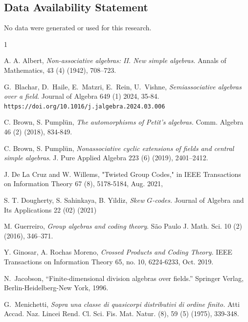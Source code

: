 \documentclass[11pt]{amsart}
\theoremstyle{plain}
\theoremstyle{definition}
\begin{document}
\subsection*{Data Availability Statement} No data were generated or used for this research.







\begin{thebibliography}{1}

 A. A. Albert, \emph{Non-associative algebras: II. New simple algebras.}
Annals of Mathematics, 43 (4) (1942), 708–723.


 G.~Blachar, D.~Haile, E.~Matzri, E.~Rein, U.~Vishne, \emph{Semiassociative algebras over a field}.
Journal of Algebra 649 (1) 2024, 35-84.
\verb#https://doi.org/10.1016/j.jalgebra.2024.03.006#

  C. Brown, S. Pumpl\"un,  \emph{The automorphisms of Petit's algebras.}
 Comm. Algebra    46 (2) (2018), 834-849. %

  C. Brown, S. Pumpl\"un, \emph{Nonassociative cyclic extensions of fields and central simple algebras}.
 J. Pure Applied Algebra 223 (6) (2019), 2401--2412.

 J. De La Cruz and W. Willems, "Twisted Group Codes," in IEEE Transactions on Information Theory 67 (8),  5178-5184, Aug. 2021,

 S. T. Dougherty, S. Sahinkaya, B. Yildiz, \emph{Skew $G$-codes.}
Journal of Algebra and Its Applications 22 (02) (2021)

 M. Guerreiro,  \emph{Group algebras and coding theory}. São Paulo J. Math. Sci. 10 (2) (2016),  346–371.

  Y. Ginosar, A. Rochas Moreno, \emph{Crossed Products and Coding Theory.}  IEEE Transactions on Information Theory 65, no. 10, 6224-6233, Oct. 2019. %

 N.~Jacobson,
``Finite-dimensional division algebras over fields.'' Springer Verlag,
Berlin-Heidelberg-New York, 1996.



 G.~Menichetti,  \emph{Sopra una classe di quasicorpi distributivi di ordine finito.}
Atti Accad. Naz. Lincei Rend. Cl. Sci. Fis. Mat. Natur. (8), 59 (5) (1975), 339-348.


\end{thebibliography}
\end{document}

